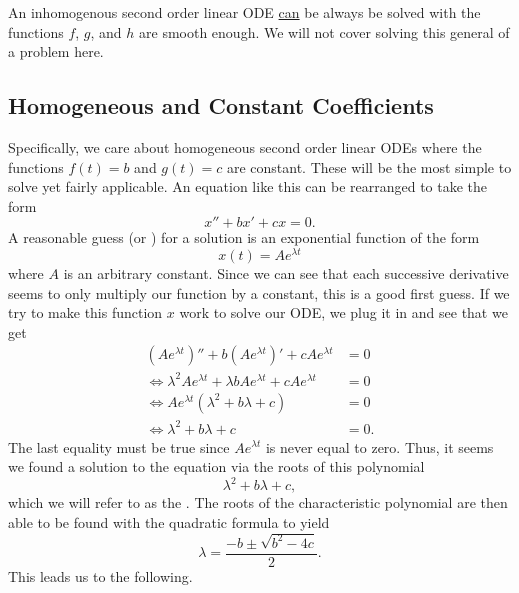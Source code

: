         \begin{remark}
        An inhomogenous second order linear ODE \underline{can} be always be solved with the functions $f$, $g$, and $h$ are smooth enough.  We will not cover solving this general of a problem here.
        \end{remark}

        \subsection{Homogeneous and Constant Coefficients}
        Specifically, we care about homogeneous second order linear ODEs where the functions $f(t)=b$ and $g(t)=c$ are constant.  These will be the most simple to solve yet fairly applicable. An equation like this can be rearranged to take the form
        \[
        x''+bx'+cx=0.
        \]
        A reasonable guess (or ) for a solution is an exponential function of the form
        \[
        x(t)=Ae^{\lambda t}
        \]
        where $A$ is an arbitrary constant. Since we can see that each successive derivative seems to only multiply our function by a constant, this is a good first guess. If we try to make this function $x$ work to solve our ODE, we plug it in and see that we get
        \begin{align*}
            \left(Ae^{\lambda t}\right)''+b\left(Ae^{\lambda t}\right)'+cAe^{\lambda t}&=0\\
            \iff\lambda^2 Ae^{\lambda t}+\lambda b Ae^{\lambda t} +c Ae^{\lambda t}&=0\\
            \iff Ae^{\lambda t}\left( \lambda^2 + b\lambda +c\right)&=0\\
            \iff \lambda^2 +b\lambda +c &=0.
        \end{align*}
        The last equality must be true since $Ae^{\lambda t}$ is never equal to zero.  Thus, it seems we found a solution to the equation via the roots of this polynomial
        \[
        \lambda^2+b\lambda +c,
        \]
        which we will refer to as the . The roots of the characteristic polynomial are then able to be found with the quadratic formula to yield
        \[
        \lambda=\frac{-b\pm \sqrt{b^2-4c}}{2}.
        \]
        This leads us to the following.

